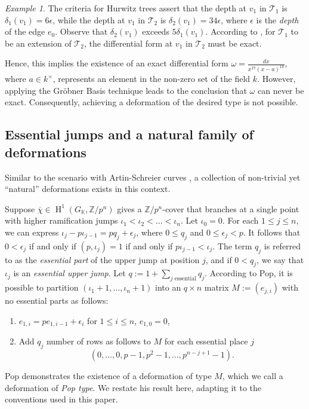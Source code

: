 \documentclass{compositio}
\theoremstyle{remark}
\newtheorem{example}[theorem]{Example}
\theoremstyle{remark}
\DeclareMathOperator{\cohom}{H}
\begin{document}
\begin{example}
The criteria for Hurwitz trees assert that the depth at $v_1$ in $\mathcal{T}_1$ is $\delta_1(v_1) = 6\epsilon$, while the depth at $v_1$ in $\mathcal{T}_2$ is $\delta_2(v_1) = 34\epsilon$, where $\epsilon$ is the \textit{depth} of the edge $e_0$. Observe that $\delta_2(v_1)$ exceeds $5\delta_1(v_1)$. According to \cite[Theorem 3.4.2 (ii) (b)]{2020arXiv201013614D}, for $\mathcal{T}_1$ to be an extension of $\mathcal{T}_2$, the differential form at $v_1$ in $\mathcal{T}_2$ must be exact.

Hence, this implies the existence of an exact differential form $\omega = \frac{dx}{x^{17}(x-a)^{18}}$, where $a \in k^{\times}$, represents an element in the non-zero set of the field $k$. However, applying the Gr{\"o}bner Basis technique \cite[\S 6.1]{2020arXiv200203719D} leads to the conclusion that $\omega$ can never be exact. Consequently, achieving a deformation of the desired type is not possible.
\end{example}










\subsection{Essential jumps and a natural family of deformations}
\label{secessentialdeform}
Similar to the scenario with Artin-Schreier curves \cite[\S 4.1]{MR2985514}, a collection of non-trivial yet ``natural'' deformations exists in this context.

Suppose $\overline{\chi} \in \cohom^1(G_\mathbb{K}, \mathbb{Z}/p^n)$ gives a $\mathbb{Z}/p^n$-cover that branches at a single point with higher ramification jumps $\iota_1<\iota_2<\ldots<\iota_n$. Let $\iota_0=0$. For each $1 \le j \le n$, we can express $\iota_j -p\iota_{j-1}=pq_j+\epsilon_j$, where $0 \le q_j$ and $0 \le \epsilon_j <p$. It follows that $0< \epsilon_j$ if and only if $(p, \iota_j)=1$ if and only if $p \iota_{j-1}<\iota_j$. The term $q_j$ is referred to as the \textit{essential part} of the upper jump at position $j$, and if $0<q_j$, we say that $\iota_j$ is an \textit{essential upper jump}. Let $q:=1+\sum_{j \text{ essential}} q_j$. According to Pop, it is possible to partition $(\iota_1+1, \ldots, \iota_{n}+1)$ into an $q \times n$ matrix $M:=(e_{j,i})$ with no essential parts as follows:
\begin{enumerate}
    \item $e_{1,i}=pe_{1,i-1}+\epsilon_i$ for $1 \le i \le n$, $e_{1,0}=0$,
    \item Add $q_j$ number of rows as follows to $M$ for each essential place $j$
    \begin{equation}
    \label{eqnrowqj}
        (0, \ldots, 0, p-1, p^2-1, \ldots, p^{n-j+1}-1).
    \end{equation}
\end{enumerate}
Pop demonstrates the existence of a deformation of type $M$, which we call a deformation of \textit{Pop type}. We restate his result here, adapting it to the conventions used in this paper.
\end{document}
